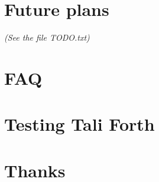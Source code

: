 \documentclass[a4paper,notitlepage]{report}
\begin{document}
\chapter{Future plans}
        \textit{(See the file TODO.txt)}


\appendix

\chapter{FAQ}
        

\chapter{Testing Tali Forth}
        

\chapter{Thanks}
        



\printindex
\end{document}

